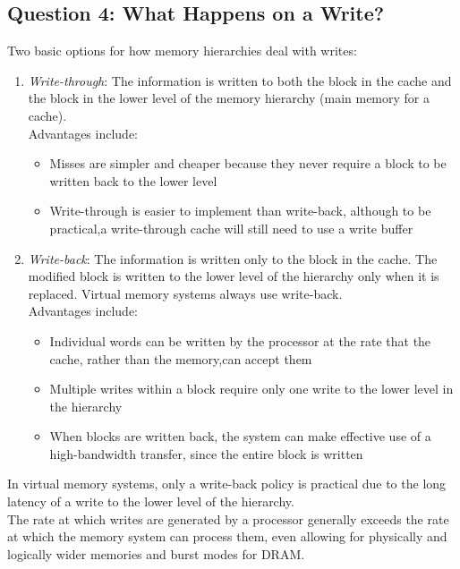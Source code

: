 \documentclass[12pt]{article}
\theoremstyle{definition}
\begin{document}
  \subsection{Question 4: What Happens on a Write?}
  Two basic options for how memory hierarchies deal with writes:
  \begin{enumerate}
    \item \emph{Write-through}: The information is written to both the block in the cache and the block in the lower level of the memory hierarchy (main memory for a cache). \\
    Advantages include:
    \begin{itemize}
      \item Misses are simpler and cheaper because they never require a block to be written back to the lower level
      \item Write-through is easier to implement than write-back, although to be practical,a write-through cache will still need to use a write buffer
    \end{itemize}
    \item \emph{Write-back}: The information is written only to the block in the cache.
    The modified block is written to the lower level of the hierarchy only when it is replaced.
    Virtual memory systems always use write-back. \\
    Advantages include:
    \begin{itemize}
      \item Individual words can be written by the processor at the rate that the cache, rather than the memory,can accept them
      \item Multiple writes within a block require only one write to the lower level in the hierarchy
      \item When blocks are written back, the system can make effective use of a high-bandwidth transfer, since the entire block is written
    \end{itemize}
  \end{enumerate}

  In virtual memory systems, only a write-back policy is practical due to the long latency of a write to the lower level of the hierarchy. \\

  The rate at which writes are generated by a processor generally exceeds the rate at which the memory system can process them, even allowing for physically and logically wider memories and burst modes for DRAM.
\end{document}
